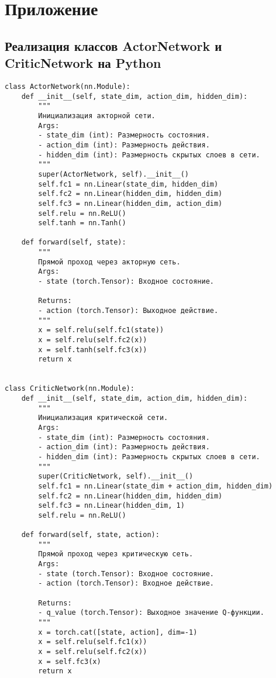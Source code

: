 \chapter{Приложение}
\label{sec:Chapter6} 

\section{Реализация классов ActorNetwork и CriticNetwork на Python}

\label{sec:networks}

\begin{verbatim}
class ActorNetwork(nn.Module):
    def __init__(self, state_dim, action_dim, hidden_dim):
        """
        Инициализация акторной сети.
        Args:
        - state_dim (int): Размерность состояния.
        - action_dim (int): Размерность действия.
        - hidden_dim (int): Размерность скрытых слоев в сети.
        """
        super(ActorNetwork, self).__init__()
        self.fc1 = nn.Linear(state_dim, hidden_dim)
        self.fc2 = nn.Linear(hidden_dim, hidden_dim)
        self.fc3 = nn.Linear(hidden_dim, action_dim)
        self.relu = nn.ReLU()
        self.tanh = nn.Tanh()

    def forward(self, state):
        """
        Прямой проход через акторную сеть.
        Args:
        - state (torch.Tensor): Входное состояние.

        Returns:
        - action (torch.Tensor): Выходное действие.
        """
        x = self.relu(self.fc1(state))
        x = self.relu(self.fc2(x))
        x = self.tanh(self.fc3(x))
        return x

    
class CriticNetwork(nn.Module):
    def __init__(self, state_dim, action_dim, hidden_dim):
        """
        Инициализация критической сети.
        Args:
        - state_dim (int): Размерность состояния.
        - action_dim (int): Размерность действия.
        - hidden_dim (int): Размерность скрытых слоев в сети.
        """
        super(CriticNetwork, self).__init__()
        self.fc1 = nn.Linear(state_dim + action_dim, hidden_dim)
        self.fc2 = nn.Linear(hidden_dim, hidden_dim)
        self.fc3 = nn.Linear(hidden_dim, 1)
        self.relu = nn.ReLU()

    def forward(self, state, action):
        """
        Прямой проход через критическую сеть.
        Args:
        - state (torch.Tensor): Входное состояние.
        - action (torch.Tensor): Входное действие.

        Returns:
        - q_value (torch.Tensor): Выходное значение Q-функции.
        """
        x = torch.cat([state, action], dim=-1)
        x = self.relu(self.fc1(x))
        x = self.relu(self.fc2(x))
        x = self.fc3(x)
        return x 

\end{verbatim}


